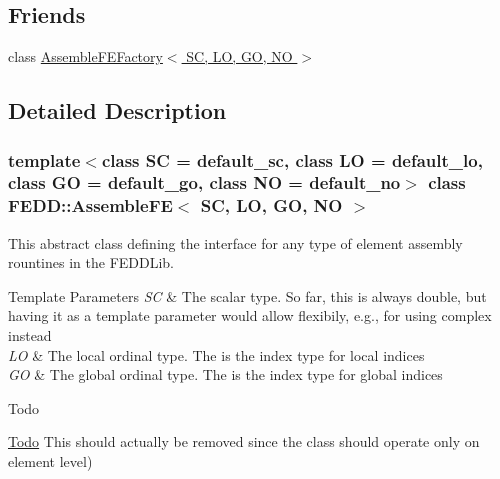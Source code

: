 \subsection*{Friends}
\begin{DoxyCompactItemize}
\item 
class \hyperlink{classFEDD_1_1AssembleFE_a30ff0dcd1d500892033fc319deacb8fb}{Assemble\+F\+E\+Factory$<$ S\+C, L\+O, G\+O, N\+O $>$}
\end{DoxyCompactItemize}


\subsection{Detailed Description}
\subsubsection*{template$<$class SC = default\+\_\+sc, class LO = default\+\_\+lo, class GO = default\+\_\+go, class NO = default\+\_\+no$>$\newline
class F\+E\+D\+D\+::\+Assemble\+F\+E$<$ S\+C, L\+O, G\+O, N\+O $>$}

This abstract class defining the interface for any type of element assembly rountines in the F\+E\+D\+D\+Lib. 


\begin{DoxyTemplParams}{Template Parameters}
{\em SC} & The scalar type. So far, this is always double, but having it as a template parameter would allow flexibily, e.\+g., for using complex instead \\
\hline
{\em LO} & The local ordinal type. The is the index type for local indices \\
\hline
{\em GO} & The global ordinal type. The is the index type for global indices \\
\hline
\end{DoxyTemplParams}
\begin{DoxyRefDesc}{Todo}
\item[\hyperlink{todo__todo000001}{Todo}]This should actually be removed since the class should operate only on element level) \end{DoxyRefDesc}

